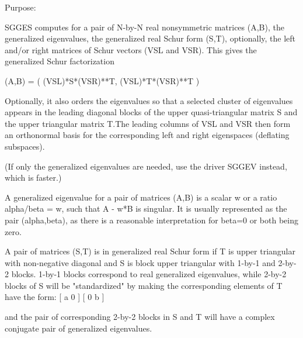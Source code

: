  \begin{DoxyParagraph}{Purpose\+: }
\begin{DoxyVerb} SGGES computes for a pair of N-by-N real nonsymmetric matrices (A,B),
 the generalized eigenvalues, the generalized real Schur form (S,T),
 optionally, the left and/or right matrices of Schur vectors (VSL and
 VSR). This gives the generalized Schur factorization

          (A,B) = ( (VSL)*S*(VSR)**T, (VSL)*T*(VSR)**T )

 Optionally, it also orders the eigenvalues so that a selected cluster
 of eigenvalues appears in the leading diagonal blocks of the upper
 quasi-triangular matrix S and the upper triangular matrix T.The
 leading columns of VSL and VSR then form an orthonormal basis for the
 corresponding left and right eigenspaces (deflating subspaces).

 (If only the generalized eigenvalues are needed, use the driver
 SGGEV instead, which is faster.)

 A generalized eigenvalue for a pair of matrices (A,B) is a scalar w
 or a ratio alpha/beta = w, such that  A - w*B is singular.  It is
 usually represented as the pair (alpha,beta), as there is a
 reasonable interpretation for beta=0 or both being zero.

 A pair of matrices (S,T) is in generalized real Schur form if T is
 upper triangular with non-negative diagonal and S is block upper
 triangular with 1-by-1 and 2-by-2 blocks.  1-by-1 blocks correspond
 to real generalized eigenvalues, while 2-by-2 blocks of S will be
 "standardized" by making the corresponding elements of T have the
 form:
         [  a  0  ]
         [  0  b  ]

 and the pair of corresponding 2-by-2 blocks in S and T will have a
 complex conjugate pair of generalized eigenvalues.\end{DoxyVerb}
 
\end{DoxyParagraph}

